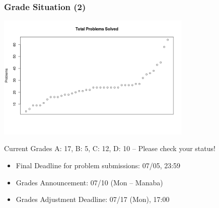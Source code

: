 \begin{frame}
  \frametitle{Grade Situation (2)}
  \begin{center}
    \includegraphics[width=0.7\textwidth]{img/totalproblemsW7}
  \end{center}

  \medskip

  {\smaller

    Current Grades A: 17, B: 5, C: 12, D: 10 -- Please check your status!
    \begin{block}{}
      \begin{itemize}
      \item Final Deadline for problem submissions: 07/05, 23:59
      \item Grades Announcement: 07/10 (Mon -- Manaba)
      \item Grades Adjustment Deadline: 07/17 (Mon), 17:00
      \end{itemize}
    \end{block}
  }
\end{frame}

